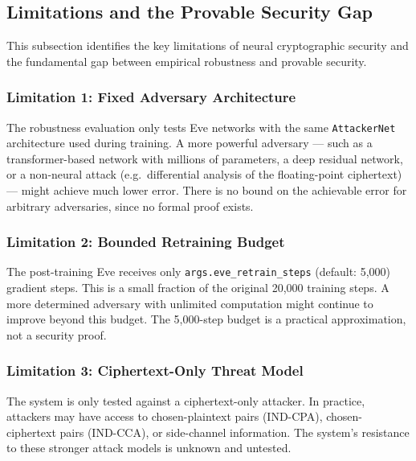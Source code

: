 \documentclass[12pt, a4paper]{article}
\newcommand{\code}[1]{\texttt{\color{CodeRed}#1}}
\begin{document}
\subsection{Limitations and the Provable Security Gap}
\label{subsec:security_limitations}

This subsection identifies the key limitations of neural cryptographic
security and the fundamental gap between empirical robustness and
provable security.

\subsubsection*{Limitation 1: Fixed Adversary Architecture}

The robustness evaluation only tests Eve networks with the same
\code{AttackerNet} architecture used during training. A more powerful
adversary --- such as a transformer-based network with millions of
parameters, a deep residual network, or a non-neural attack (e.g.\
differential analysis of the floating-point ciphertext) --- might
achieve much lower error. There is no bound on the achievable error
for arbitrary adversaries, since no formal proof exists.

\subsubsection*{Limitation 2: Bounded Retraining Budget}

The post-training Eve receives only \code{args.eve\_retrain\_steps}
(default: 5{,}000) gradient steps. This is a small fraction of the
original 20{,}000 training steps. A more determined adversary with
unlimited computation might continue to improve beyond this budget.
The 5{,}000-step budget is a practical approximation, not a
security proof.

\subsubsection*{Limitation 3: Ciphertext-Only Threat Model}

The system is only tested against a ciphertext-only attacker. In
practice, attackers may have access to chosen-plaintext pairs
(IND-CPA), chosen-ciphertext pairs (IND-CCA), or side-channel
information. The system's resistance to these stronger attack models
is unknown and untested.
\end{document}
